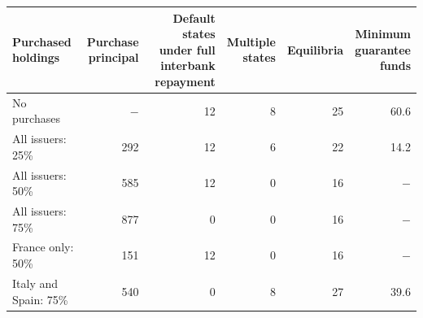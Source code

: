 \begin{tabularx}{\textwidth}{@{}>{\raggedright\arraybackslash}Xrrrrr@{}}
\toprule
Purchased holdings & \shortstack{Purchase\\principal} & \shortstack{Default states\\under full\\interbank repayment} & \shortstack{Multiple\\states} & Equilibria & \shortstack{Minimum\\guarantee\\funds} \\
\midrule
No purchases & $-$ & 12 & 8 & 25 & 60.6 \\
All issuers: 25\% & 292 & 12 & 6 & 22 & 14.2 \\
All issuers: 50\% & 585 & 12 & 0 & 16 & $-$ \\
All issuers: 75\% & 877 & 0 & 0 & 16 & $-$ \\
France only: 50\% & 151 & 12 & 0 & 16 & $-$ \\
Italy and Spain: 75\% & 540 & 0 & 8 & 27 & 39.6 \\
\bottomrule
\end{tabularx}

